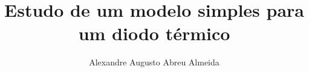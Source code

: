 \documentclass[master,american]{ThesisPUC}
\author{Alexandre Augusto Abreu Almeida}
\title{Estudo de um modelo simples para um diodo térmico}
\begin{document}
  
  
  
  
  
  
  \arial
  \nocite{*}
  
  \normalfont
  
\end{document}
